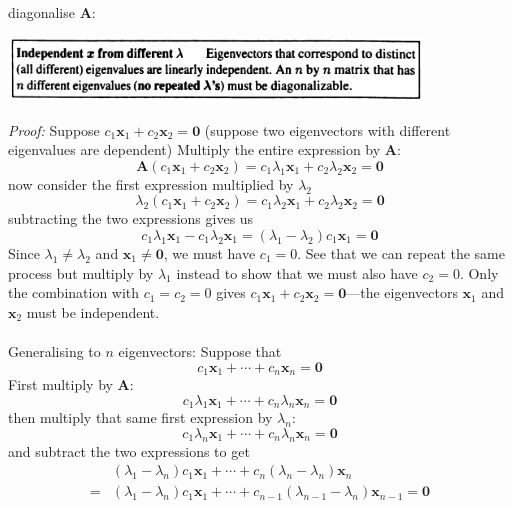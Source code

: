 \documentclass{report}
\begin{document}
diagonalise $\bm A$:
\begin{center}
\includegraphics[width=11cm]{119}
\end{center}
\textit{Proof:} Suppose $c_1\bm x_1+c_2\bm x_2=\bm 0$ (suppose two eigenvectors with different eigenvalues are dependent) 
Multiply the entire expression by $\bm A$:
\begin{equation*}
\bm A(c_1\bm x_1+c_2\bm x_2)=c_1\lambda_1\bm x_1+c_2\lambda_2\bm x_2=\bm 0
\end{equation*}
now consider the first expression multiplied by $\lambda_2$
\begin{equation*}
\lambda_2(c_1\bm x_1+c_2\bm x_2)=c_1\lambda_2\bm x_1+c_2\lambda_2\bm x_2=\bm 0
\end{equation*}
subtracting the two expressions gives us
\begin{equation*}
c_1\lambda_1\bm x_1-c_1\lambda_2\bm x_1=(\lambda_1-\lambda_2)c_1\bm x_1=\bm 0
\end{equation*}
Since $\lambda_1\neq\lambda_2$ and $\bm x_1\neq\bm0$, we must have
$c_1=0$. See that we can repeat the same process but multiply by $\lambda_1$ instead to show that we must also have $c_2=0$. Only the combination with $c_1=c_2=0$ gives
$c_1\bm x_1+c_2\bm x_2=\bm 0$---the eigenvectors $\bm x_1$ and $\bm x_2$ must be independent.\\
\vspace{1mm}\\
Generalising to $n$ eigenvectors: Suppose that
\begin{equation*}
c_1\bm x_1+\cdots+c_n\bm x_n=\bm 0
\end{equation*}
First multiply by $\bm A$:
\begin{equation*}
c_1\lambda_1\bm x_1+\cdots+c_n\lambda_n\bm x_n=\bm 0
\end{equation*}
then multiply that same first expression by $\lambda_n$:
\begin{equation*}
c_1\lambda_n\bm x_1+\cdots+c_n\lambda_n\bm x_n=\bm 0
\end{equation*}
and subtract the two expressions to get
\begin{align*}
&(\lambda_1-\lambda_n)c_1\bm x_1+\cdots+c_n(\lambda_n-\lambda_n)\bm x_n\\
=&(\lambda_1-\lambda_n)c_1\bm x_1+\cdots+c_{n-1}(\lambda_{n-1}-\lambda_n)\bm x_{n-1}=\bm 0
\end{align*}
\end{document}
